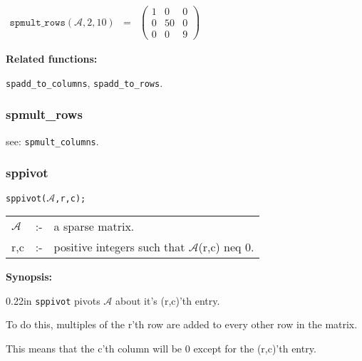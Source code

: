 \vspace*{0.1in}

\begin{flushleft}  
\hspace*{0.1in}
\begin{math}  
\begin{array}{ccc}
\texttt{spmult\_rows}(\mathcal{A},2,10) & = & 
        \left( \begin{array}{ccc} 1 & 0 & 0 \\ 0 & 50 & 0 \\ 0 & 0 & 
9 \end{array} \right) 
\end{array}
\end{math}  
\end{flushleft}

\textbf{Related functions:}

\hspace*{0.175in} \texttt{spadd\_to\_columns}, \texttt{spadd\_to\_rows}.


\subsubsection{spmult\_rows}

\hspace*{0.175in} see: \texttt{spmult\_columns}.


\subsubsection{sppivot}

\hspace*{0.175in} \texttt{sppivot($\mathcal{A}$,r,c);}

\hspace*{0.1in}  
\begin{tabular}{l l l} 
$\mathcal{A}$ &:-& a sparse matrix. \\
r,c        &:-& positive integers such that $\mathcal{A}$(r,c) neq 0.
\end{tabular}

\textbf{Synopsis:} %

\begin{addtolength}{\leftskip}{0.22in}
\texttt{sppivot} pivots $\mathcal{A}$ about it's (r,c)'th entry. 
 
To do this, multiples of the r'th row are added to every
     other row in the matrix. 

This means that the c'th column
                will be 0 except for the (r,c)'th entry. 

\end{addtolength}

